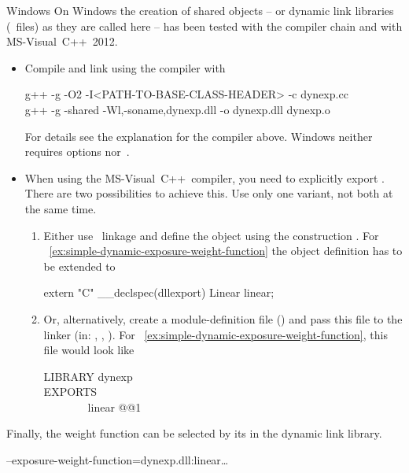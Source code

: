\begin{restrictedmaterial}{Windows}
  \noindent On Windows the creation of shared objects -- or dynamic link libraries
  (~files) as they are called here -- has been tested with the 
  compiler chain and with MS-Visual~C++~2012.

  \begin{itemize}
  \item
    Compile and link using the  compiler with

    \begin{literal}
      g++ -g -O2 -I<PATH-TO-BASE-CLASS-HEADER> -c dynexp.cc \\
      g++ -g -shared -Wl,-soname,dynexp.dll -o dynexp.dll dynexp.o
    \end{literal}

    For details see the explanation for the  compiler above.  Windows neither
    requires options  nor~.

  \item
    When using the MS-Visual~C++~compiler, you need to explicitly export .
    There are two possibilities to achieve this.  Use only one variant, not both at the same
    time.

    \begin{enumerate}
    \item
      Either use ~linkage and define the object using the construction
      .  For
      \exampleName~\ref{ex:simple-dynamic-exposure-weight-function} the object definition has to
      be extended to

      \begin{cxxlisting}
extern "C"
{
  __declspec(dllexport) Linear linear;
}
      \end{cxxlisting}

    \item
      Or, alternatively, create a module-definition file () and pass this file to
      the linker (in: , , ).  For \exampleName~\ref{ex:simple-dynamic-exposure-weight-function},
      this file would look like

      \begin{literal}
        LIBRARY dynexp \\
        EXPORTS \\
        ~~~~~~~~linear @@1 \\
      \end{literal}
    \end{enumerate}
  \end{itemize}

  Finally, the weight function can be selected by its  in the dynamic link
  library.

  \begin{literal}
    \app{} --exposure-weight-function=dynexp.dll:linear\dots
  \end{literal}
\end{restrictedmaterial}

